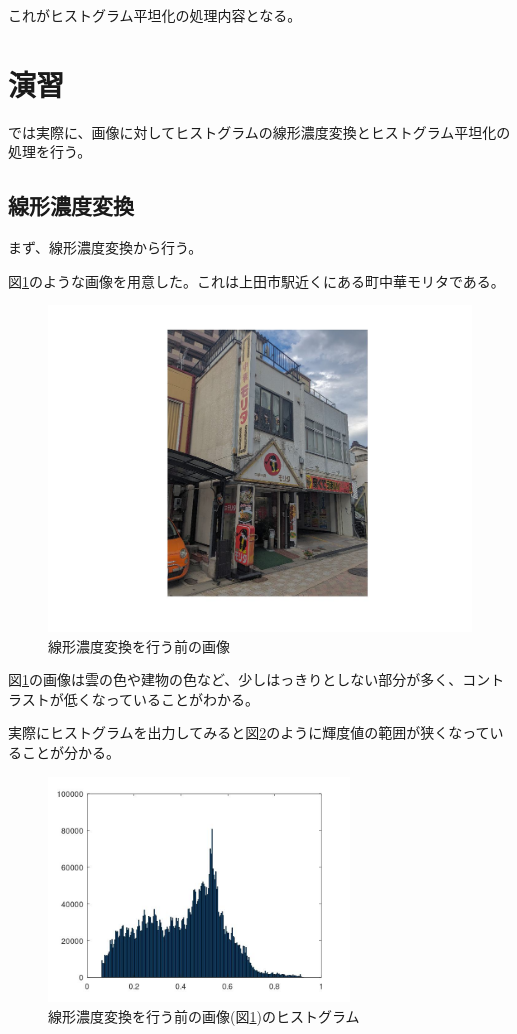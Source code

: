 \documentclass[a4paper,11pt,dvipdfmx]{jsarticle}
\begin{document}
これがヒストグラム平坦化の処理内容となる。

\section{演習}
では実際に、画像に対してヒストグラムの線形濃度変換とヒストグラム平坦化の処理を行う。

\subsection{線形濃度変換}
まず、線形濃度変換から行う。

図\ref{Morita}のような画像を用意した。これは上田市駅近くにある町中華モリタである。
\begin{figure}[htbp]
    \centering
    \includegraphics[width=120mm]{./img/linear_beforeimg.jpg}
    \caption{線形濃度変換を行う前の画像}
    \label{Morita}
\end{figure}

図\ref{Morita}の画像は雲の色や建物の色など、少しはっきりとしない部分が多く、コントラストが低くなっていることがわかる。

\newpage
実際にヒストグラムを出力してみると図\ref{bfhist}のように輝度値の範囲が狭くなっていることが分かる。
\begin{figure}[htbp]
    \centering
    \includegraphics[width=80mm]{./img/linear_beforefunc.jpg}
    \caption{線形濃度変換を行う前の画像(図\ref{Morita})のヒストグラム}
    \label{bfhist}
\end{figure}
\end{document}

